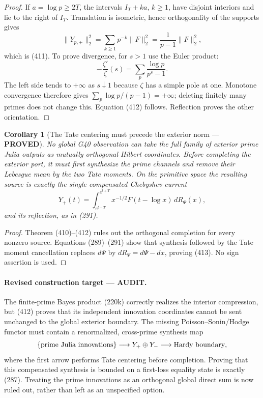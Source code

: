 \documentclass[11pt]{article}
\newtheorem{corollary}[theorem]{Corollary}
\newcommand{\PROVED}{\textcolor{green!45!black}{\textbf{PROVED}}}
\newcommand{\AUDIT}{\textcolor{orange!75!black}{\textbf{AUDIT}}}
\begin{document}
\begin{proof}
If $a=\log p\ge2T$, the intervals
$I_T+ka$, $k\ge1$, have disjoint interiors and lie to the right of $I_T$.
Translation is isometric, hence orthogonality of the supports gives
\[
 \|Y_{p,+}\|_2^2
 =\sum_{k\ge1}p^{-k}\|F\|_2^2
 =\frac1{p-1}\|F\|_2^2,
\]
which is (411).  To prove divergence, for $s>1$ use the Euler product:
\[
 -\frac{\zeta'}{\zeta}(s)
 =\sum_p\frac{\log p}{p^s-1}.
\]
The left side tends to $+\infty$ as $s\downarrow1$ because $\zeta$ has a
simple pole at one.  Monotone convergence therefore gives
$\sum_p\log p/(p-1)=+\infty$; deleting finitely many primes does not change
this.  Equation (412) follows.  Reflection proves the other orientation.
\end{proof}

\begin{corollary}[The Tate centering must precede the exterior norm ---
\PROVED]
No global G40 observation can take the full family of exterior prime Julia
outputs as mutually orthogonal Hilbert coordinates.  Before completing the
exterior port, it must first synthesize the prime channels and remove their
Lebesgue mean by the two Tate moments.  On the primitive space the resulting
source is exactly the single compensated Chebyshev current
\begin{equation}
 Y_+(t)=\int_{e^{t-T}}^{e^{t+T}}
 x^{-1/2}F(t-\log x)\,dR_\Psi(x),                    \tag{413}
\end{equation}
and its reflection, as in (291).
\end{corollary}

\begin{proof}
Theorem (410)--(412) rules out the orthogonal completion for every nonzero
source.  Equations (289)--(291) show that synthesis followed by the Tate
moment cancellation replaces $d\Psi$ by $dR_\Psi=d\Psi-dx$, proving (413).
No sign assertion is used.
\end{proof}

\paragraph{Revised construction target --- \AUDIT.}
The finite-prime Bayes product (220k) correctly realizes the interior
compression, but (412) proves that its independent innovation coordinates
cannot be sent unchanged to the global exterior boundary.  The missing
Poisson--Sonin/Hodge functor must contain a renormalized, cross-prime
synthesis map
\[
 \{\hbox{prime Julia innovations}\}
 \longrightarrow Y_+\oplus Y_-
 \longrightarrow \hbox{Hardy boundary},
\]
where the first arrow performs Tate centering before completion.  Proving
that this compensated synthesis is bounded on a first-loss equality state
is exactly (287).  Treating the prime innovations as an orthogonal global
direct sum is now ruled out, rather than left as an unspecified option.
\end{document}
